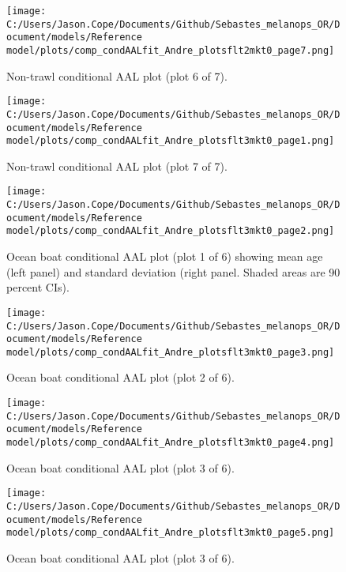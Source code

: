 \documentclass[11pt,
  english,
  letterpaper,
]{article}
\begin{document}
\begin{figure}
\centering
\texttt{[image: C:/Users/Jason.Cope/Documents/Github/Sebastes\_melanops\_OR/Document/models/Reference model/plots/comp\_condAALfit\_Andre\_plotsflt2mkt0\_page7.png]}
\caption{Non-trawl conditional AAL plot (plot 6 of 7).\label{fig:comp_condAALfit_Andre_plotsflt2mkt0_page7}}
\end{figure}

\begin{figure}
\centering
\texttt{[image: C:/Users/Jason.Cope/Documents/Github/Sebastes\_melanops\_OR/Document/models/Reference model/plots/comp\_condAALfit\_Andre\_plotsflt3mkt0\_page1.png]}
\caption{Non-trawl conditional AAL plot (plot 7 of 7).\label{fig:comp_condAALfit_Andre_plotsflt3mkt0_page1}}
\end{figure}

\begin{figure}
\centering
\texttt{[image: C:/Users/Jason.Cope/Documents/Github/Sebastes\_melanops\_OR/Document/models/Reference model/plots/comp\_condAALfit\_Andre\_plotsflt3mkt0\_page2.png]}
\caption{Ocean boat conditional AAL plot (plot 1 of 6) showing mean age (left panel) and standard deviation (right panel. Shaded areas are 90 percent CIs).\label{fig:comp_condAALfit_Andre_plotsflt3mkt0_page2}}
\end{figure}

\begin{figure}
\centering
\texttt{[image: C:/Users/Jason.Cope/Documents/Github/Sebastes\_melanops\_OR/Document/models/Reference model/plots/comp\_condAALfit\_Andre\_plotsflt3mkt0\_page3.png]}
\caption{Ocean boat conditional AAL plot (plot 2 of 6).\label{fig:comp_condAALfit_Andre_plotsflt3mkt0_page3}}
\end{figure}

\begin{figure}
\centering
\texttt{[image: C:/Users/Jason.Cope/Documents/Github/Sebastes\_melanops\_OR/Document/models/Reference model/plots/comp\_condAALfit\_Andre\_plotsflt3mkt0\_page4.png]}
\caption{Ocean boat conditional AAL plot (plot 3 of 6).\label{fig:comp_condAALfit_Andre_plotsflt3mkt0_page4}}
\end{figure}

\begin{figure}
\centering
\texttt{[image: C:/Users/Jason.Cope/Documents/Github/Sebastes\_melanops\_OR/Document/models/Reference model/plots/comp\_condAALfit\_Andre\_plotsflt3mkt0\_page5.png]}
\caption{Ocean boat conditional AAL plot (plot 3 of 6).\label{fig:comp_condAALfit_Andre_plotsflt3mkt0_page5}}
\end{figure}
\end{document}
